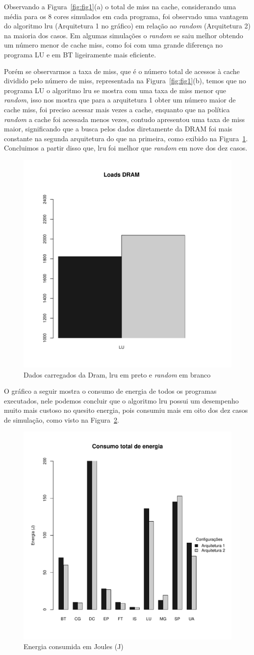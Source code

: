 \documentclass[12pt]{article}
\begin{document}
Observando a Figura~\ref{fig:fig1}(a) o total de miss na cache, considerando uma média para os 8 cores simulados em cada programa, foi observado uma vantagem do algoritmo lru (Arquitetura 1 no gráfico) em relação ao \textit{random} (Arquitetura 2) na maioria dos casos. Em algumas simulações o \textit{random} se saiu melhor obtendo um número menor de cache miss, como foi com uma grande diferença no programa LU e em BT ligeiramente mais eficiente. 

Porém se observarmos a taxa de miss, que é o número total de acessos à cache dividido pelo número de miss, representada na Figura~\ref{fig:fig1}(b), temos que no programa LU o algoritmo lru se mostra com uma taxa de miss menor que \textit{random}, isso nos mostra que para a arquitetura 1 obter um número maior de cache miss, foi preciso acessar mais vezes a cache, enquanto que na política \textit{random} a cache foi acessada menos vezes, contudo apresentou uma taxa de miss maior, significando que a busca pelos dados diretamente da DRAM foi mais constante na segunda arquitetura do que na primeira, como exibido na Figura~\ref{fig:Fig2}. Concluimos a partir disso que, lru foi melhor que \textit{random} em nove dos dez casos.

\begin{figure}[!h]
\centering
\includegraphics[width=.4\textwidth]{dramLoads.pdf}
\caption{Dados carregados da Dram, lru em preto e \textit{random} em branco}
\label{fig:Fig2}
\end{figure}

O gráfico a seguir mostra o consumo de energia de todos os programas executados, nele podemos concluir que o algoritmo lru possui um desempenho muito mais custoso no quesito energia, pois consumiu mais em oito dos dez casos de simulação, como visto na Figura~\ref{fig:Fig3}.

\begin{figure}[!h]
\centering
\includegraphics[width=.4\textwidth]{energia.pdf}
\caption{Energia consumida em Joules (J)}
\label{fig:Fig3}
\end{figure}
\end{document}
